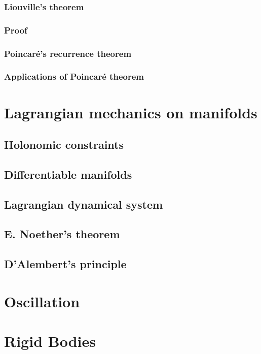 \documentclass[uplatex,dvipdfmx]{jsreport}
\begin{document}
\subsection{Liouville's theorem}

\subsection{Proof}

\subsection{Poincaré's recurrence theorem}

\subsection{Applications of Poincaré theorem}

\chapter{Lagrangian mechanics on manifolds}

\section{Holonomic constraints}

\section{Differentiable manifolds}

\section{Lagrangian dynamical system}

\section{E. Noether's theorem}

\section{D'Alembert's principle}

\chapter{Oscillation}

\chapter{Rigid Bodies}
\end{document}
